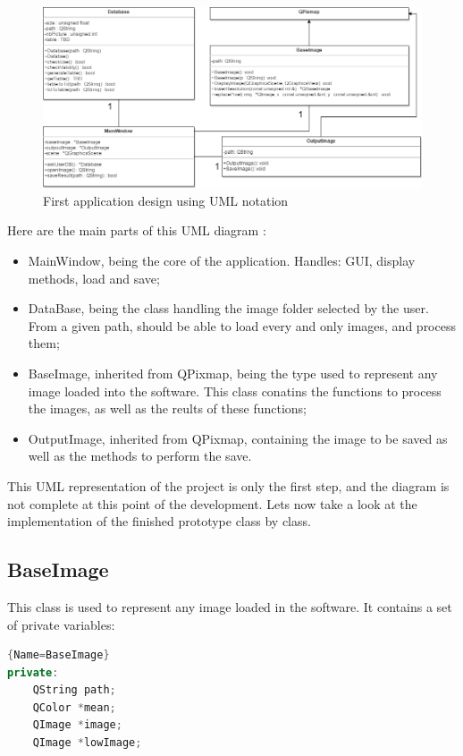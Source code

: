 \documentclass[aps,letterpaper,11pt]{revtex4}
\begin{document}
\begin{figure}[H]
	\centering
	\includegraphics[width=15cm]{First_UML.png}
	\caption{First application design using UML notation}
	\label{fig: FirstUML}    
\end{figure}

Here are the main parts of this UML diagram :

\begin{itemize}
  \item MainWindow, being the core of the application. Handles: GUI, display methods, load and save;
  \item DataBase, being the class handling the image folder selected by the user. From a given path, should be able to load every and only images, and process them;
  \item BaseImage, inherited from QPixmap, being the type used to represent any image loaded into the software. This class conatins the functions to process the images, as well as the reults of these functions;
  \item OutputImage, inherited from QPixmap, containing the image to be saved as well as the methods to perform the save.
\end{itemize}

This UML representation of the project is only the first step, and the diagram is not complete at this point of the development. 
Lets now take a look at the implementation of the finished prototype class by class.

\subsection{BaseImage}
This class is used to represent any image loaded in the software. It contains a set of private variables:

\begin{lstlisting}[language=C++]{Name=BaseImage}
private:
    QString path;
    QColor *mean;
    QImage *image;
    QImage *lowImage;
\end{lstlisting}
\end{document}
